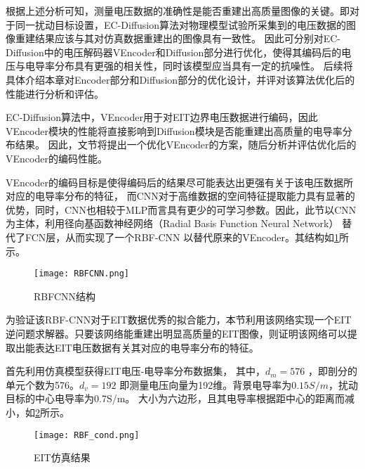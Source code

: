 根据上述分析可知，测量电压数据的准确性是能否重建出高质量图像的关键。即对于同一扰动目标设置，EC-Diffusion算法对物理模型试验所采集到的电压数据的图像重建结果应该与其对仿真数据重建出的图像具有一致性。
因此可分别对EC-Diffusion中的电压解码器VEncoder和Diffusion部分进行优化，使得其编码后的电压与电导率分布具有更强的相关性，同时该模型应当具有一定的抗噪性。
后续将具体介绍本章对Encoder部分和Diffusion部分的优化设计，并评对该算法优化后的性能进行分析和评估。


EC-Diffusion算法中，VEncoder用于对EIT边界电压数据进行编码，因此VEncoder模块的性能将直接影响到Diffusion模块是否能重建出高质量的电导率分布结果。
因此，文节将提出一个优化VEncoder的方案，随后分析并评估优化后的VEncoder的编码性能。


VEncoder的编码目标是使得编码后的结果尽可能表达出更强有关于该电压数据所对应的电导率分布的特征，
而CNN对于高维数据的空间特征提取能力具有显著的优势，同时，CNN也相较于MLP而言具有更少的可学习参数。因此，此节以CNN为主体，利用径向基函数神经网络（Radial Basis Function Neural Network）
替代了FCN层，从而实现了一个RBF-CNN 以替代原来的VEncoder。其结构如\cref{figure:RBFCNN}所示。
\begin{figure}[h]
    \centering
    \texttt{[image: RBFCNN.png]}
    \caption{RBFCNN结构}
    \label{figure:RBFCNN}
\end{figure}

为验证该RBF-CNN对于EIT数据优秀的拟合能力，本节利用该网络实现一个EIT逆问题求解器。只要该网络能重建出明显高质量的EIT图像，则证明该网络可以提取出能表达EIT电压数据有关其对应的电导率分布的特征。

首先利用仿真模型获得EIT电压-电导率分布数据集，
其中，$d_m =  576$ ，即剖分的单元个数为576。$d_v = 192$ 即测量电压向量为192维。背景电导率为$0.15S/m$，扰动目标的中心电导率为0.7S/m。
大小为六边形，且其电导率根据距中心的距离而减小，如\cref{figure:RBF_cond}所示。
\begin{figure}[h]
    \centering
    \texttt{[image: RBF\_cond.png]}
    \caption{EIT仿真结果}
    \label{figure:RBF_cond}
\end{figure}

